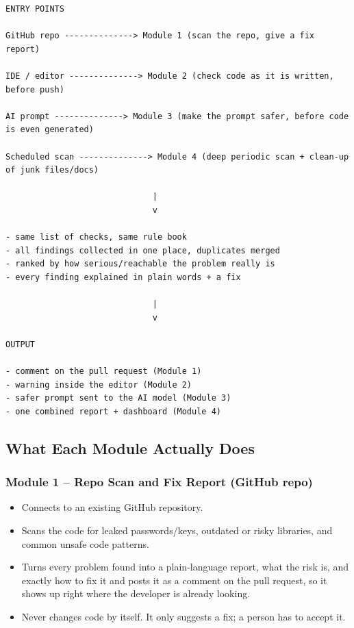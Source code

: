 \documentclass[12pt,a4paper]{article}
\begin{document}
\begin{verbatim}
ENTRY POINTS

GitHub repo --------------> Module 1 (scan the repo, give a fix report)

IDE / editor --------------> Module 2 (check code as it is written, before push)

AI prompt --------------> Module 3 (make the prompt safer, before code is even generated)

Scheduled scan --------------> Module 4 (deep periodic scan + clean-up of junk files/docs)

                              |
                              v

- same list of checks, same rule book
- all findings collected in one place, duplicates merged
- ranked by how serious/reachable the problem really is
- every finding explained in plain words + a fix

                              |
                              v

OUTPUT

- comment on the pull request (Module 1)
- warning inside the editor (Module 2)
- safer prompt sent to the AI model (Module 3)
- one combined report + dashboard (Module 4)
\end{verbatim}

\subsection{What Each Module Actually Does}

\subsubsection{Module 1 -- Repo Scan and Fix Report (GitHub repo)}

\begin{itemize}
    \item Connects to an existing GitHub repository.

    \item Scans the code for leaked passwords/keys, outdated or risky libraries, and common unsafe code patterns.

    \item Turns every problem found into a plain-language report, what the risk is, and exactly how to fix it and posts it as a comment on the pull request, so it shows up right where the developer is already looking.

    \item Never changes code by itself. It only suggests a fix; a person has to accept it.
\end{itemize}
\end{document}
